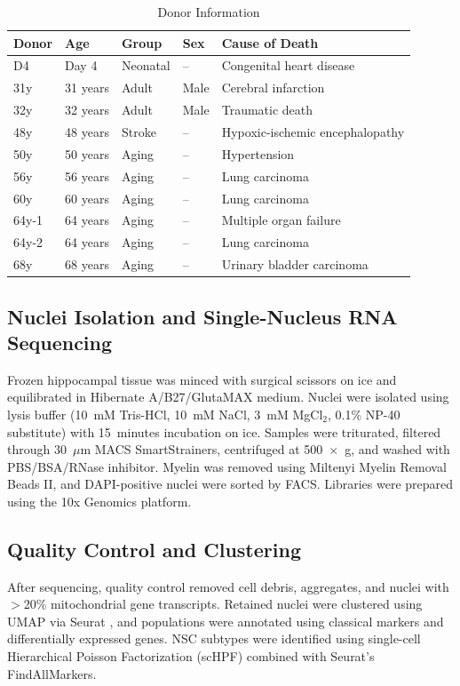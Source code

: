 \documentclass[11pt]{article}
\begin{document}
\begin{table}[ht]
\centering
\caption{Donor Information}
\label{tab:donors}
\begin{tabular}{lllll}
\toprule
\textbf{Donor} & \textbf{Age} & \textbf{Group} & \textbf{Sex} & \textbf{Cause of Death} \\
\midrule
D4 & Day 4 & Neonatal & -- & Congenital heart disease \\
31y & 31 years & Adult & Male & Cerebral infarction \\
32y & 32 years & Adult & Male & Traumatic death \\
48y & 48 years & Stroke & -- & Hypoxic-ischemic encephalopathy \\
50y & 50 years & Aging & -- & Hypertension \\
56y & 56 years & Aging & -- & Lung carcinoma \\
60y & 60 years & Aging & -- & Lung carcinoma \\
64y-1 & 64 years & Aging & -- & Multiple organ failure \\
64y-2 & 64 years & Aging & -- & Lung carcinoma \\
68y & 68 years & Aging & -- & Urinary bladder carcinoma \\
\bottomrule
\end{tabular}
\end{table}

\subsection{Nuclei Isolation and Single-Nucleus RNA Sequencing}

Frozen hippocampal tissue was minced with surgical scissors on ice and equilibrated in Hibernate A/B27/GlutaMAX medium. Nuclei were isolated using lysis buffer (10~mM Tris-HCl, 10~mM NaCl, 3~mM MgCl$_2$, 0.1\% NP-40 substitute) with 15~minutes incubation on ice. Samples were triturated, filtered through 30~$\mu$m MACS SmartStrainers, centrifuged at 500~$\times$~g, and washed with PBS/BSA/RNase inhibitor. Myelin was removed using Miltenyi Myelin Removal Beads II, and DAPI-positive nuclei were sorted by FACS. Libraries were prepared using the 10x Genomics platform.

\subsection{Quality Control and Clustering}

After sequencing, quality control removed cell debris, aggregates, and nuclei with $>$20\% mitochondrial gene transcripts. Retained nuclei were clustered using UMAP via Seurat \citep{hao2021integrated}, and populations were annotated using classical markers and differentially expressed genes. NSC subtypes were identified using single-cell Hierarchical Poisson Factorization (scHPF) combined with Seurat's FindAllMarkers.
\end{document}
